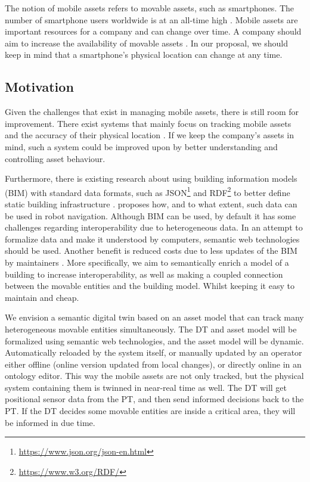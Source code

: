 \documentclass{article}
\begin{document}
The notion of mobile assets refers to movable assets, such as smartphones. The number of smartphone users worldwide is at an all-time high \cite{petroc_taylor_number_2023}. Mobile assets are important resources for a company and can change over time. A company should aim to increase the availability of movable assets \cite{marcheta_development_2022}. In our proposal, we should keep in mind that a smartphone's physical location can change at any time.

\subsection{Motivation}
Given the challenges that exist in managing mobile assets, there is still room for improvement. There exist systems that mainly focus on tracking mobile assets and the accuracy of their physical location \cite{marcheta_development_2022,akram_design_2021}. If we keep the company's assets in mind, such a system could be improved upon by better understanding and controlling asset behaviour.

Furthermore, there is existing research about using building information models (BIM) with standard data formats, such as JSON\footnote{\url{https://www.json.org/json-en.html}} and RDF\footnote{\url{https://www.w3.org/RDF/}} to better define static building infrastructure \cite{pauwels_live_2023}. \citeauthor{pauwels_live_2023} proposes how, and to what extent, such data can be used in robot navigation. Although BIM can be used, by default it has some challenges regarding interoperability \cite{dinis_bim_2022} due to heterogeneous data. In an attempt to formalize data and make it understood by computers, semantic web technologies should be used. Another benefit is reduced costs due to less updates of the BIM by maintainers \cite{hamledari_ifc-based_2018}.
More specifically, we aim to semantically enrich a model of a building to increase interoperability, as well as making a coupled connection between the movable entities and the building model. Whilst keeping it easy to maintain and cheap.

We envision a semantic digital twin based on an asset model that can track many heterogeneous movable entities simultaneously. The DT and asset model will be formalized using semantic web technologies, and the asset model will be dynamic. Automatically reloaded by the system itself, or manually updated by an operator either offline (online version updated from local changes), or directly online in an ontology editor. This way the mobile assets are not only tracked, but the physical system containing them is twinned in near-real time as well. The DT will get positional sensor data from the PT, and then send informed decisions back to the PT. If the DT decides some movable entities are inside a critical area, they will be informed in due time.
\end{document}
